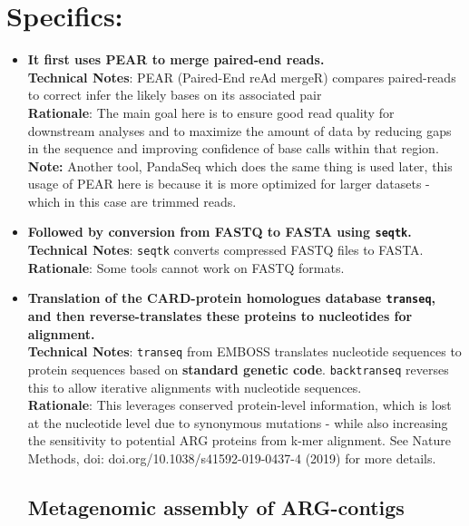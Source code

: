 \documentclass[11pt]{article}
\begin{document}
\section*{Specifics:}
\begin{itemize}
	\subsection{Preprocessing}
	\item \textbf{It first uses PEAR to merge paired-end reads.}\\
	\textbf{Technical Notes}: PEAR (Paired-End reAd mergeR) compares paired-reads to correct infer the likely  bases on its associated pair\\
	\textbf{Rationale}: The main goal here is to ensure good read quality for downstream analyses and to maximize the amount of data by reducing gaps in the sequence and improving confidence of base calls within that region.\\
	\textbf{Note:} Another tool, PandaSeq which does the same thing is used later, this usage of PEAR here is because it is more optimized for larger datasets - which in this case are trimmed reads.
	
	\item \textbf{Followed by conversion from FASTQ to FASTA using \texttt{seqtk}.}\\
	\textbf{Technical Notes}: \texttt{seqtk} converts compressed FASTQ files to FASTA. \\
	\textbf{Rationale}: Some tools cannot work on FASTQ formats.
	
	\item \textbf{Translation of the CARD-protein homologues database \texttt{transeq}, and then reverse-translates these proteins to nucleotides for alignment.}\\
	\textbf{Technical Notes}: \texttt{transeq} from EMBOSS translates nucleotide sequences to protein sequences based on \textbf{standard genetic code}. \texttt{backtranseq} reverses this to allow iterative alignments with nucleotide sequences. \\
	\textbf{Rationale}: This leverages conserved protein-level information, which is lost at the nucleotide level due to synonymous mutations - while also increasing the sensitivity to potential ARG proteins from k-mer alignment. See Nature Methods, doi: doi.org/10.1038/s41592-019-0437-4 (2019) for more details.
	
	\subsection{Metagenomic assembly of ARG-contigs}
		

\end{itemize}
\end{document}

